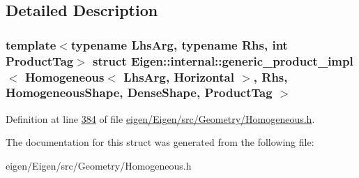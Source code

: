 \subsection{Detailed Description}
\subsubsection*{template$<$typename Lhs\+Arg, typename Rhs, int Product\+Tag$>$\newline
struct Eigen\+::internal\+::generic\+\_\+product\+\_\+impl$<$ Homogeneous$<$ Lhs\+Arg, Horizontal $>$, Rhs, Homogeneous\+Shape, Dense\+Shape, Product\+Tag $>$}



Definition at line \hyperlink{eigen_2_eigen_2src_2_geometry_2_homogeneous_8h_source_l00384}{384} of file \hyperlink{eigen_2_eigen_2src_2_geometry_2_homogeneous_8h_source}{eigen/\+Eigen/src/\+Geometry/\+Homogeneous.\+h}.



The documentation for this struct was generated from the following file\+:\begin{DoxyCompactItemize}
\item 
eigen/\+Eigen/src/\+Geometry/\+Homogeneous.\+h\end{DoxyCompactItemize}
